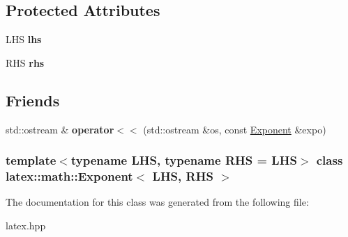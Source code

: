\subsection*{\-Protected \-Attributes}
\begin{DoxyCompactItemize}
\item 
\hypertarget{classlatex_1_1math_1_1Exponent_ad40337048de2ea8e851c22eb049d934e}{\-L\-H\-S {\bfseries lhs}}\label{classlatex_1_1math_1_1Exponent_ad40337048de2ea8e851c22eb049d934e}

\item 
\hypertarget{classlatex_1_1math_1_1Exponent_a444be024ab8d61010355c8621dc3594a}{\-R\-H\-S {\bfseries rhs}}\label{classlatex_1_1math_1_1Exponent_a444be024ab8d61010355c8621dc3594a}

\end{DoxyCompactItemize}
\subsection*{\-Friends}
\begin{DoxyCompactItemize}
\item 
\hypertarget{classlatex_1_1math_1_1Exponent_a56873f9cc4a3a04da6c90eb781512537}{std\-::ostream \& {\bfseries operator$<$$<$} (std\-::ostream \&os, const \hyperlink{classlatex_1_1math_1_1Exponent}{\-Exponent} \&expo)}\label{classlatex_1_1math_1_1Exponent_a56873f9cc4a3a04da6c90eb781512537}

\end{DoxyCompactItemize}
\subsubsection*{template$<$typename \-L\-H\-S, typename \-R\-H\-S = \-L\-H\-S$>$ class latex\-::math\-::\-Exponent$<$ L\-H\-S, R\-H\-S $>$}



\-The documentation for this class was generated from the following file\-:\begin{DoxyCompactItemize}
\item 
latex.\-hpp\end{DoxyCompactItemize}

